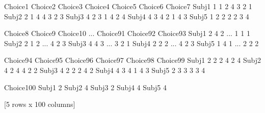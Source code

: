 \documentclass[letterpaper,10pt,english]{jupyterBook}
\begin{document}
\begin{sphinxVerbatim}[commandchars=\\\{\}]
        Choice\PYGZus{}1  Choice\PYGZus{}2  Choice\PYGZus{}3  Choice\PYGZus{}4  Choice\PYGZus{}5  Choice\PYGZus{}6  Choice\PYGZus{}7  \PYGZbs{}
Subj\PYGZus{}1         1         1         2         4         3         2         1   
Subj\PYGZus{}2         2         1         4         4         3         2         3   
Subj\PYGZus{}3         4         2         3         1         4         2         4   
Subj\PYGZus{}4         4         3         4         2         1         4         3   
Subj\PYGZus{}5         1         2         2         2         2         3         4   

        Choice\PYGZus{}8  Choice\PYGZus{}9  Choice\PYGZus{}10  ...  Choice\PYGZus{}91  Choice\PYGZus{}92  Choice\PYGZus{}93  \PYGZbs{}
Subj\PYGZus{}1         2         4          2  ...          1          1          1   
Subj\PYGZus{}2         2         1          2  ...          4          2          3   
Subj\PYGZus{}3         4         4          3  ...          3          2          1   
Subj\PYGZus{}4         2         2          2  ...          4          2          3   
Subj\PYGZus{}5         1         4          1  ...          2          2          2   

        Choice\PYGZus{}94  Choice\PYGZus{}95  Choice\PYGZus{}96  Choice\PYGZus{}97  Choice\PYGZus{}98  Choice\PYGZus{}99  \PYGZbs{}
Subj\PYGZus{}1          2          2          2          4          2          4   
Subj\PYGZus{}2          4          2          4          4          2          2   
Subj\PYGZus{}3          4          2          2          2          4          2   
Subj\PYGZus{}4          4          3          4          1          4          3   
Subj\PYGZus{}5          2          3          3          3          3          4   

        Choice\PYGZus{}100  
Subj\PYGZus{}1           2  
Subj\PYGZus{}2           4  
Subj\PYGZus{}3           2  
Subj\PYGZus{}4           4  
Subj\PYGZus{}5           4  

[5 rows x 100 columns]
\end{sphinxVerbatim}

\begin{sphinxVerbatim}[commandchars=\\\{\}]
  
  
  
\end{sphinxVerbatim}
\end{document}
